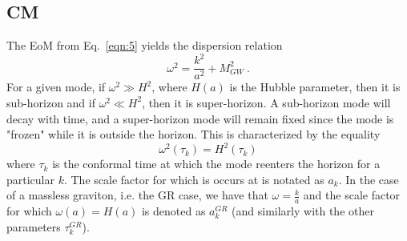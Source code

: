\documentclass[prd,twocolumn,aps,psfig,nofootinbib,nobibnotes,superscriptaddress,preprintnumbers,times]{revtex4-2}
\begin{document}
\subsection{CM}
The EoM from Eq.\ \ref{eqn:5} yields the dispersion relation
\begin{equation}\label{eqn:10}
    \omega^2 = \frac{k^2}{a^2} + M_{GW}^2\ .
\end{equation}
 For a given mode, if $\omega^2 \gg H^2$, where $H(a)$ is the Hubble parameter, then it is sub-horizon and if $\omega^2 \ll H^2$, then it is super-horizon. A sub-horizon mode will decay with time, and a super-horizon mode will remain fixed since the mode is "frozen" while it is outside the horizon. This is characterized by the equality  
 \begin{equation}\label{eqn:11}
     \omega^2(\tau_k) = H^2(\tau_k)
 \end{equation} where $\tau_k$ is the conformal time at which the mode reenters the horizon for a particular $k$. The scale factor for which is occurs at is notated as $a_k$. In the case of a massless graviton, i.e. the GR case, we have that $\omega = \frac{k}{a}$ and the scale factor for which $\omega(a) = H(a)$ is denoted as $a_{k}^{GR}$ (and similarly with the other parameters $\tau_k^{GR}$).
\end{document}
